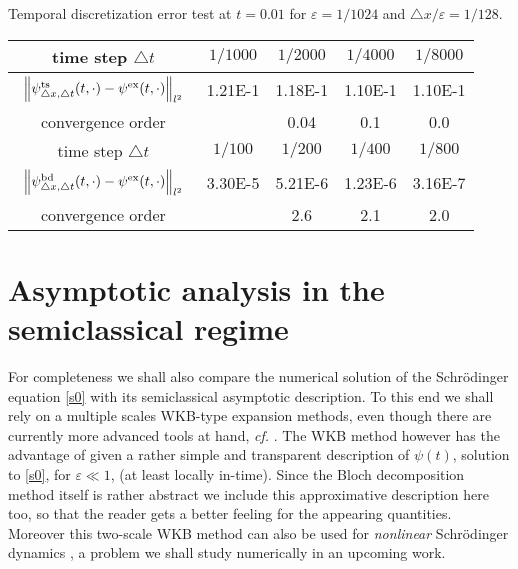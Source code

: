 \documentclass[leqno,final]{siamltex}
\numberwithin{equation}{section}
\newcounter{me}
\begin{document}
\begin{table}[htbp]
\begin{center}
{Temporal discretization error test at $t=0.01$ for ${{\varepsilon }}=1/1024$
and ${\triangle} x/{{\varepsilon }}=1/128$.}
\begin{tabular}{c|cccc}\hline
time step ${\triangle} t$& $1/1000$ & $1/2000$ & $1/4000$ &   $1/8000$ \\
\hline
$\begin{array}{c}\vspace*{-4mm} \\
\left\|\psi^{\rm ts}_{{\triangle} x,{\triangle} t}(t,\cdot)-\psi^{\rm
ex}(t,\cdot)\right\|_{l^2}\\ \vspace*{-4mm} \end{array}$
 &  1.21E-1 & 1.18E-1 &  1.10E-1 & 1.10E-1 \\ \hline
convergence order & & 0.04 & 0.1& 0.0 \\ \hline \hline time step
${\triangle} t$& $1/100$ & $1/200$ & $1/400$ &   $1/800$ \\ \hline
$\begin{array}{c}\vspace*{-4mm} \\
\left\|\psi^{\rm bd}_{{\triangle} x,{\triangle} t}(t,\cdot)-\psi^{\rm
ex}(t,\cdot)\right\|_{l^2}\\ \vspace*{-4mm} \end{array}$
 &  3.30E-5& 5.21E-6 &  1.23E-6 & 3.16E-7 \\ \hline
convergence order & & 2.6 & 2.1& 2.0  \\ \hline
\end{tabular}
\end{center}
\end{table}
\section{Asymptotic analysis in the semiclassical regime}\label{sec:asym}

For completeness we shall also compare the numerical solution of
the Schr\"odinger equation \eqref{s0} with its semiclassical
asymptotic description. To this end we shall rely on a multiple
scales WKB-type expansion methods, even though there are currently
more advanced tools at hand, {{\sl cf.\/ }} \cite{GMMP, PST, Te}. The WKB
method however has the advantage of given a rather simple and
transparent description of $\psi(t)$, solution to \eqref{s0}, for
${{\varepsilon }} \ll 1$, (at least locally in-time). Since the Bloch
decomposition method itself is rather abstract we include this
approximative description here too, so that the reader gets a
better feeling for the appearing quantities. Moreover this
two-scale WKB method can also be used for \emph{nonlinear}
Schr\"odinger dynamics \cite{CMS}, a problem we shall study
numerically in an upcoming work.
\end{document}
